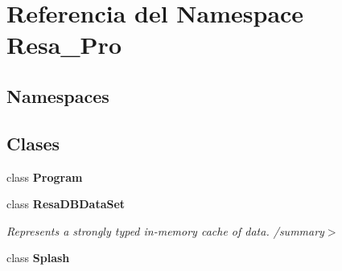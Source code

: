 \section{Referencia del Namespace Resa\+\_\+\+Pro}
\label{namespace_resa___pro}
\subsection*{Namespaces}
\begin{DoxyCompactItemize}
\end{DoxyCompactItemize}
\subsection*{Clases}
\begin{DoxyCompactItemize}
\item 
class {\bfseries Program}
\item 
class {\bf Resa\+D\+B\+Data\+Set}
\begin{DoxyCompactList}\small\item\em Represents a strongly typed in-\/memory cache of data. /summary$>$ \end{DoxyCompactList}\item 
class {\bf Splash}
\end{DoxyCompactItemize}
